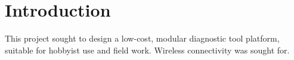 \section[Introduction]{Introduction}
This project sought to design a low-cost, modular diagnostic tool platform, 
suitable for hobbyist use and field work. Wireless connectivity was sought for. 

